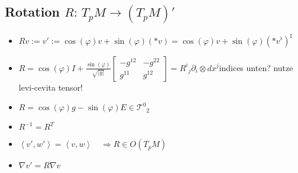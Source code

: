 \documentclass{scrartcl}
\newlength{\wlen}
\newcommand{\upperleftright}[3]{\,\settowidth{\wlen}{$#2$}\hspace{-\wlen}\mbox{$\phantom{#2}$}^{#1}{#2}^{#3}}
\newcommand{\sftensor}[3]{{{#1}^{#2}}_{#3}}
\newcommand{\sfbasis}[2]{\partial_{#1}\otimes dx^{#2}}
\begin{document}
    \subsection{Rotation \( R:\, T_{p}M \rightarrow (T_{p}M)' \)}
      \begin{itemize}
        \item \( Rv := v' := \cos(\varphi) v + \sin(\varphi)(*v) 
                           = \cos(\varphi) v + \sin(\varphi)(*v^{\flat})^{\sharp}\)
        \item \( R = \cos(\varphi)I + \frac{\sin(\varphi)}{\sqrt{|g|}}
                    \begin{bmatrix}
                      -g^{12} & -g^{22} \\
                      g^{11} & g^{12}
                    \end{bmatrix} 
                 = \sftensor{R}{i}{j} \sfbasis{i}{j}\){\color{red}indices unten? nutze levi-cevita tensor!}
        \item \( R = \cos(\varphi)g - \sin(\varphi)E \in \sftensor{\mathcal{T}}{0}{2}\)
        \item \( R^{-1} = R^{T} \)
        \item \( \left\langle v',w' \right\rangle = \left\langle v,w \right\rangle 
                  \quad \Rightarrow R\in O(T_{p}M) \)
        \item \( \nabla v' = R\nabla v \)
      \end{itemize}

\end{document}
